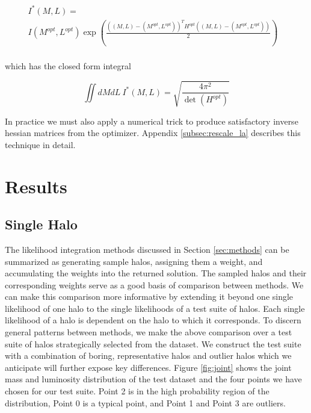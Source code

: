 \documentclass[\docopts]{\docclass}
\begin{document}
{\tiny
\begin{align*}
I^*(M,L) = &\\
I(M^{opt}, L^{opt})\exp\left(\frac{((M,L) - (M^{opt}, L^{opt}))^TH^{opt}((M,L) - (M^{opt}, L^{opt}))}{2}\right)&\\
\end{align*}
}

\noindent which has the closed form integral 

$$\iint dMdL\ I^*(M,L) = \sqrt{\frac{4\pi^2}{\det(H^{opt})}}$$

\noindent In practice we must also apply a numerical trick to produce satisfactory inverse hessian matrices from the optimizer. Appendix \ref{subsec:rescale_la} describes this technique in detail.


\section{Results}
\label{sec:results}

\subsection{Single Halo}

The likelihood integration methods discussed in Section \ref{sec:methods} can be summarized as generating sample halos, assigning them a weight, and accumulating the weights into the returned solution. 
The sampled halos and their corresponding weights serve as a good basis of comparison between methods. 
We can make this comparison more informative by extending it beyond one single likelihood of one halo to the single likelihoods of a test suite of halos. 
Each single likelihood of a halo is dependent on the halo to which it corresponds. 
To discern general patterns between methods, we make the above comparison over a test suite of halos strategically selected from the dataset.
We construct the test suite with a combination of boring, representative halos and outlier halos which we anticipate will further expose key differences. 
Figure \ref{fig:joint} shows the joint mass and luminosity distribution of the test dataset and the four points we have chosen for our test suite.
Point 2 is in the high probability region of the distribution, Point 0 is a typical point, and Point 1 and Point 3 are outliers. 
\end{document}
